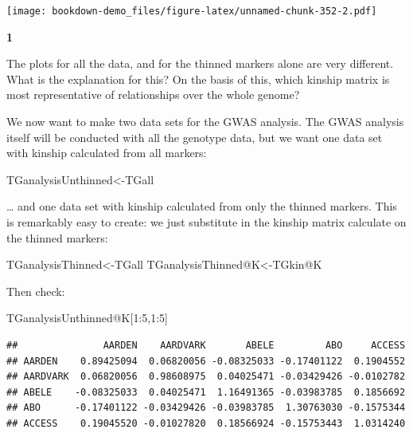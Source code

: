 \documentclass[
]{book}
\makeatletter
\newenvironment{Shaded}{\begin{snugshade}}{\end{snugshade}}
\newcommand{\DecValTok}[1]{\textcolor[rgb]{0.00,0.00,0.81}{#1}}
\newcommand{\NormalTok}[1]{#1}
\newcommand{\OtherTok}[1]{\textcolor[rgb]{0.56,0.35,0.01}{#1}}
\newcommand{\SpecialCharTok}[1]{\textcolor[rgb]{0.00,0.00,0.00}{#1}}
\newenvironment{kframe}{%
\medskip{}
\setlength{\fboxsep}{.8em}
 \def\at@end@of@kframe{}%
 \ifinner\ifhmode%
  \def\at@end@of@kframe{\end{minipage}}%
  \begin{minipage}{\columnwidth}%
 \fi\fi%
 \def\FrameCommand##1{\hskip\@totalleftmargin \hskip-\fboxsep
 \colorbox{shadecolor}{##1}\hskip-\fboxsep
     \hskip-\linewidth \hskip-\@totalleftmargin \hskip\columnwidth}%
 \MakeFramed {\advance\hsize-\width
   \@totalleftmargin\z@ \linewidth\hsize
   \@setminipage}}%
 {\par\unskip\endMakeFramed%
 \at@end@of@kframe}
\newenvironment{rmdblock}[1]
  {
  \begin{itemize}
  \renewcommand{\labelitemi}{
    \raisebox{-.7\height}[0pt][0pt]{
      {\setkeys{Gin}{width=3em,keepaspectratio}\texttt{[image: images/\#1]}}
    }
  }
  \setlength{\fboxsep}{1em}
  \begin{kframe}
  \item
  }
  {
  \end{kframe}
  \end{itemize}
  }
\newenvironment{rmdquiz}
  {\begin{rmdblock}{quiz}}
  {\end{rmdblock}}
\makeatother
\begin{document}
\texttt{[image: bookdown-demo\_files/figure-latex/unnamed-chunk-352-2.pdf]}

\begin{rmdquiz}
\textbf{1}

The plots for all the data, and for the thinned markers alone are very different. What is the explanation for this? On the basis of this, which kinship matrix is most representative of relationships over the whole genome?
\end{rmdquiz}

We now want to make two data sets for the GWAS analysis. The GWAS analysis itself will be conducted with all the genotype data, but we want one data set with kinship calculated from all markers:

\begin{Shaded}
\begin{Highlighting}[]
\NormalTok{TGanalysisUnthinned}\OtherTok{\textless{}{-}}\NormalTok{TGall }
\end{Highlighting}
\end{Shaded}

\ldots{} and one data set with kinship calculated from only the thinned markers. This is remarkably easy to create: we just substitute in the kinship matrix calculate on the thinned markers:

\begin{Shaded}
\begin{Highlighting}[]
\NormalTok{TGanalysisThinned}\OtherTok{\textless{}{-}}\NormalTok{TGall}
\NormalTok{TGanalysisThinned}\SpecialCharTok{@}\NormalTok{K}\OtherTok{\textless{}{-}}\NormalTok{TGkin}\SpecialCharTok{@}\NormalTok{K }
\end{Highlighting}
\end{Shaded}

Then check:

\begin{Shaded}
\begin{Highlighting}[]
\NormalTok{TGanalysisUnthinned}\SpecialCharTok{@}\NormalTok{K[}\DecValTok{1}\SpecialCharTok{:}\DecValTok{5}\NormalTok{,}\DecValTok{1}\SpecialCharTok{:}\DecValTok{5}\NormalTok{] }
\end{Highlighting}
\end{Shaded}

\begin{verbatim}
##               AARDEN    AARDVARK       ABELE         ABO     ACCESS
## AARDEN    0.89425094  0.06820056 -0.08325033 -0.17401122  0.1904552
## AARDVARK  0.06820056  0.98608975  0.04025471 -0.03429426 -0.0102782
## ABELE    -0.08325033  0.04025471  1.16491365 -0.03983785  0.1856692
## ABO      -0.17401122 -0.03429426 -0.03983785  1.30763030 -0.1575344
## ACCESS    0.19045520 -0.01027820  0.18566924 -0.15753443  1.0314240
\end{verbatim}
\end{document}
